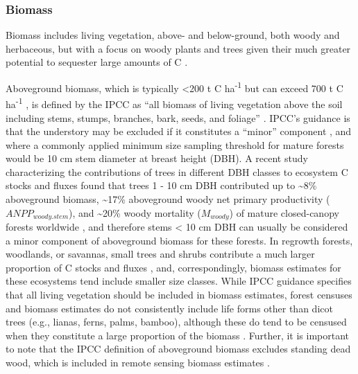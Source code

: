 \documentclass[, manuscript]{copernicus}
\begin{document}
\subsubsection{Biomass}

Biomass includes living vegetation, above- and below-ground, both woody
and herbaceous, but with a focus on woody plants and trees given their
much greater potential to sequester large amounts of C
\citep{ipcc_2006_2006}.

Aboveground biomass, which is typically \textless200 t C
ha\textsuperscript{-1} but can exceed 700 t C ha\textsuperscript{-1}
\citep{anderson-teixeira_carbon_2021}, is defined by the IPCC as ``all
biomass of living vegetation above the soil including stems, stumps,
branches, bark, seeds, and foliage''
\citep{ipcc_good_2003, ipcc_2006_2006}. IPCC's guidance is that the
understory may be excluded if it constitutes a ``minor'' component
\citep[defined as \textless{} 25 - 30 \% of emissions/removals for the
overall category,][]{ipcc_2006_2006}, and where a commonly applied
minimum size sampling threshold for mature forests would be 10 cm stem
diameter at breast height (DBH). A recent study characterizing the
contributions of trees in different DBH classes to ecosystem C stocks
and fluxes found that trees 1 - 10 cm DBH contributed up to
\textasciitilde8\% aboveground biomass, \textasciitilde17\% aboveground
woody net primary productivity (\(ANPP_{woody.stem}\)), and
\textasciitilde20\% woody mortality (\(M_{woody}\)) of mature
closed-canopy forests worldwide \citep{piponiot_distribution_2022}, and
therefore stems \textless{} 10 cm DBH can usually be considered a minor
component of aboveground biomass for these forests. In regrowth forests,
woodlands, or savannas, small trees and shrubs contribute a much larger
proportion of C stocks and fluxes
\citep{lutz_global_2018, piponiot_distribution_2022, hughes_biomass_1999},
and, correspondingly, biomass estimates for these ecosystems tend
include smaller size classes. While IPCC guidance specifies that all
living vegetation should be included in biomass estimates, forest
censuses and biomass estimates do not consistently include life forms
other than dicot trees (e.g., lianas, ferns, palms, bamboo), although
these do tend to be censused when they constitute a large proportion of
the biomass \citep[e.g.,][]{fukushima_recovery_2007}. Further, it is
important to note that the IPCC definition of aboveground biomass
excludes standing dead wood, which is included in remote sensing biomass
estimates \citep{duncanson_aboveground_2021}.
\end{document}
